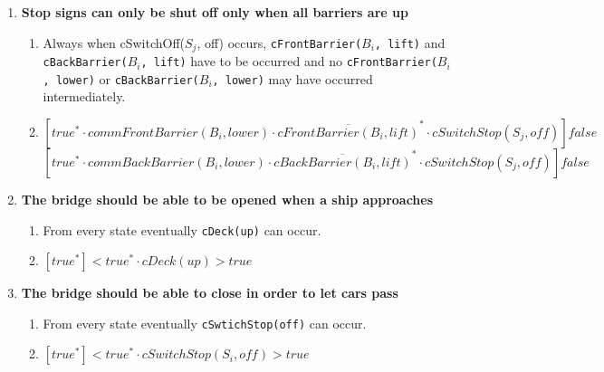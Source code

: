 \begin{enumerate}
	\item \textbf{Stop signs can only be shut off only when all barriers are up}
	\begin{enumerate}
		\item Always when cSwitchOff($S_j$, off) occurs, \texttt{cFrontBarrier($B_i$, lift)} and \texttt{cBackBarrier($B_i$, lift)} have to be occurred and no \texttt{cFrontBarrier($B_i$, lower)} or \texttt{cBackBarrier($B_i$, lower)} may have occurred intermediately.
		\item $[true^* \cdot commFrontBarrier(B_i, lower) \cdot \overline{cFrontBarrier(B_i, lift)}^{*} \cdot cSwitchStop(S_j, off)]false$
					$[true^* \cdot commBackBarrier(B_i, lower) \cdot \overline{cBackBarrier(B_i, lift)}^{*} \cdot cSwitchStop(S_j, off)]false$
	\end{enumerate}

	\item \textbf{The bridge should be able to be opened when a ship approaches}
	\begin{enumerate}
		\item From every state eventually \texttt{cDeck(up)} can occur.
		\item $[true^*]<true^* \cdot cDeck(up)>true$
	\end{enumerate}

	\item \textbf{The bridge should be able to close in order to let cars pass}
	\begin{enumerate}
		\item From every state eventually \texttt{cSwtichStop(off)} can occur.
		\item $[true^*]<true^* \cdot cSwitchStop(S_i, off)>true$
	\end{enumerate}



\end{enumerate}

\newpage

